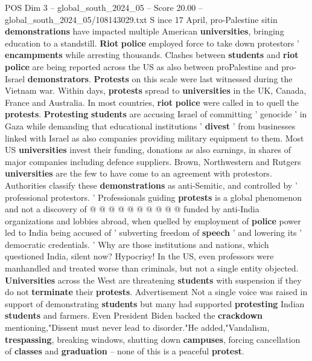 \begin{textsample}{POS Dim 3 – global\_south\_2024\_05 – Score 20.00 – global\_south\_2024\_05/108143029.txt}  \label{ex:f3_pos_109}
S ince 17 April, pro-Palestine sitin \textbf{demonstrations} have impacted multiple American \textbf{universities}, bringing education to a standstill. \textbf{Riot} \textbf{police} employed force to take down protestors ' \textbf{encampments} while arresting thousands.
Clashes between \textbf{students} and \textbf{riot} \textbf{police} are being reported across the US as also between proPalestine and pro-Israel \textbf{demonstrators}. \textbf{Protests} on this scale were last witnessed during the Vietnam war.
Within days, \textbf{protests} spread to \textbf{universities} in the UK, Canada, France and Australia.
In most countries, \textbf{riot} \textbf{police} were called in to quell the \textbf{protests}. \textbf{Protesting} \textbf{students} are accusing Israel of committing ' genocide ' in Gaza while demanding that educational institutions ' \textbf{divest} ' from businesses linked with Israel as also companies providing military equipment to them.
Most US \textbf{universities} invest their funding, donations as also earnings, in shares of major companies including defence suppliers.
Brown, Northwestern and Rutgers \textbf{universities} are the few to have come to an agreement with protestors.
Authorities classify these \textbf{demonstrations} as anti-Semitic, and controlled by ' professional protestors. ' Professionals guiding \textbf{protests} is a global phenomenon and not a discovery of @ @ @ @ @ @ @ @ @ @ funded by anti-India organizations and lobbies abroad, when quelled by employment of \textbf{police} power led to India being accused of ' subverting freedom of \textbf{speech} ' and lowering its ' democratic credentials. ' Why are those institutions and nations, which questioned India, silent now?
Hypocrisy!
In the US, even professors were manhandled and treated worse than criminals, but not a single entity objected. \textbf{Universities} across the West are threatening \textbf{students} with suspension if they do not \textbf{terminate} their \textbf{protests}.
Advertisement Not a single voice was raised in support of demonstrating \textbf{students} but many had supported \textbf{protesting} Indian \textbf{students} and farmers.
Even President Biden backed the \textbf{crackdown} mentioning,"Dissent must never lead to disorder."He added,"Vandalism, \textbf{trespassing}, breaking windows, shutting down \textbf{campuses}, forcing cancellation of \textbf{classes} and \textbf{graduation} -- none of this is a peaceful \textbf{protest}.

\end{textsample}
